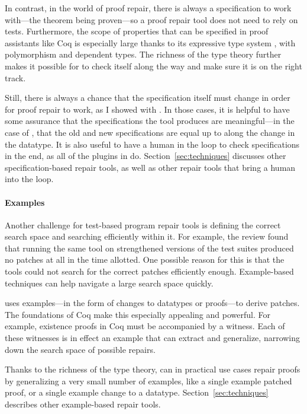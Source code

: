 In contrast, in the world of proof repair, there is always a specification to work with---the theorem being proven---so
a proof repair tool does not need to rely on tests.
Furthermore, the scope of properties that can be specified in proof assistants like Coq is especially large thanks to its expressive type system ,
with polymorphism and dependent types.
The richness of the type theory further makes it possible for \sysnamelong to check itself along the way and make sure it is on the right track.

Still, there is always a chance that the specification itself must change in order for proof repair to work,
as I showed with \toolnamec.
In those cases, it is helpful to have some assurance that the specifications the tool produces are meaningful---in the case of
\toolnamec, that the old and new specifications are equal up to  along the change in the datatype.
It is also useful to have a human in the loop to check specifications in the end,
as all of the plugins in \sysnamelong do.
Section~\ref{sec:techniques} discusses other specification-based repair tools,
as well as other repair tools that bring a human into the loop.

\paragraph{Examples}
Another challenge for test-based program repair tools is defining the correct search space and searching efficiently within it.
For example, the review found that running the same tool on strengthened versions of the test suites produced no patches at all in the time allotted.
One possible reason for this is that the tools could not search for the correct patches efficiently enough.
Example-based techniques can help navigate a large search space quickly.

\sysnamelong uses examples---in the form of changes to datatypes or proofs---to derive patches.
The  foundations of Coq make this especially appealing and powerful.
For example, existence proofs in Coq must be accompanied by a witness.
Each of these witnesses is in effect an example that \sysnamelong can extract and generalize,
narrowing down the search space of possible repairs.

Thanks to the richness of the type theory, \sysnamelong can in practical use cases repair proofs by generalizing a very small number of examples,
like a single example patched proof, or a single example change to a datatype.
Section~\ref{sec:techniques} describes other example-based repair tools.

